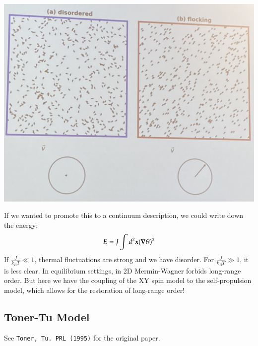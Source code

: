 \begin{center}
    \includegraphics[scale=0.35]{Lectures/Images/lec8-flocking.png}
\end{center}

If we wanted to promote this to a continuum description, we could write down the energy:
\begin{equation}
    E = J\int d^2\v{x}(\nabla \theta)^2
\end{equation}
If $\frac{J}{k_B T} \ll 1$, thermal fluctuations are strong and we have disorder. For $\frac{J}{k_B T} \gg 1$, it is less clear. In equilibrium settings, in 2D Mermin-Wagner forbids long-range order. But here we have the coupling of the XY spin model to the self-propulsion model, which allows for the restoration of long-range order!

\subsection{Toner-Tu Model}
See \texttt{Toner, Tu.\ PRL (1995)} for the original paper.

